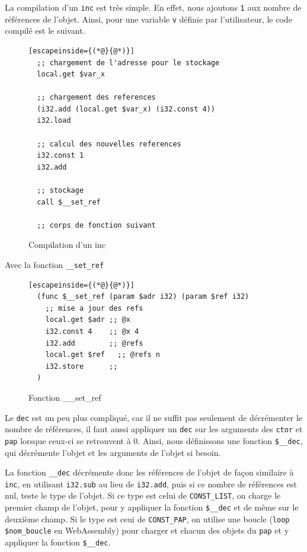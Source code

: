 \documentclass{rapportECL}
\begin{document}
La compilation d'un \verb|inc| est très simple. En effet, nous ajoutons \verb|1| aux nombre de références de l'objet. 
Ainsi, pour une variable \verb|v| définie par l'utilisateur, le code compilé est le suivant.

\begin{figure}[H]
	\begin{lstlisting}[escapeinside={(*@}{@*)}]
  ;; chargement de l'adresse pour le stockage
  local.get $var_x

  ;; chargement des references
  (i32.add (local.get $var_x) (i32.const 4)) 
  i32.load
   
  ;; calcul des nouvelles references
  i32.const 1
  i32.add

  ;; stockage
  call $__set_ref

  ;; corps de fonction suivant
	\end{lstlisting}
	\caption{Compilation d'un inc}
	\label{listing:compile_inc}
\end{figure}

Avec la fonction \verb|__set_ref|

\begin{figure}[H]
	\begin{lstlisting}[escapeinside={(*@}{@*)}]
  (func $__set_ref (param $adr i32) (param $ref i32)
    ;; mise a jour des refs
    local.get $adr ;; @x
    i32.const 4    ;; @x 4
    i32.add        ;; @refs
    local.get $ref   ;; @refs n
    i32.store      ;;
  )
	\end{lstlisting}
	\caption{Fonction \_\_set\_ref}
	\label{listing:set_ref}
\end{figure}

Le \verb|dec| est un peu plus compliqué, car il ne suffit pas seulement de décrémenter le nombre de références, il faut aussi 
appliquer un \verb|dec| sur les arguments des \verb|ctor| et \verb|pap| lorsque ceux-ci se retrouvent à 0.
Ainsi, nous définissons une fonction \verb|$__dec|, qui décrémente l'objet et les arguments de l'objet si besoin.

La fonction \verb|__dec| décrémente donc les références de l'objet de façon similaire à \verb|inc|, en utilisant \verb|i32.sub| 
au lieu de \verb|i32.add|, puis si ce nombre de références est nul, teste le type de l'objet. Si ce type est celui de 
\verb|CONST_LIST|, on charge le premier champ de l'objet, pour y appliquer la fonction \verb|$__dec| et de même
sur le deuxième champ. Si le type est ceui de \verb|CONST_PAP|, on utilise une boucle (\verb|loop $nom_boucle| en WebAssembly) pour
charger et chacun des objets du \verb|pap| et y appliquer la fonction \verb|$__dec|.
\end{document}
